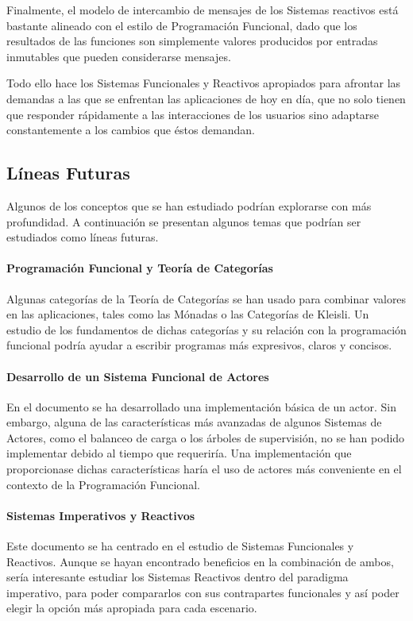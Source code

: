 \documentclass[../main.tex]{subfiles}
\begin{document}
Finalmente, el modelo de intercambio de mensajes de los Sistemas reactivos está bastante
alineado con el estilo de Programación Funcional, dado que los resultados de las funciones
son simplemente valores producidos por entradas inmutables que pueden considerarse mensajes.

Todo ello hace los Sistemas Funcionales y Reactivos apropiados para afrontar las demandas a las que
se enfrentan las aplicaciones de hoy en día, que no solo tienen que responder rápidamente
a las interacciones de los usuarios sino adaptarse constantemente a los cambios que éstos demandan.

\subsection{Líneas Futuras}
Algunos de los conceptos que se han estudiado podrían explorarse con más profundidad. A continuación
se presentan algunos temas que podrían ser estudiados como líneas futuras.


\paragraph{Programación Funcional y Teoría de Categorías}

Algunas categorías de la Teoría de Categorías se han usado para combinar valores
en las aplicaciones, tales como las Mónadas o las Categorías de Kleisli. Un estudio
de los fundamentos de dichas categorías y su relación con la programación funcional
podría ayudar a escribir programas más expresivos, claros y concisos.

\paragraph{Desarrollo de un Sistema Funcional de Actores}

En el documento se ha desarrollado una implementación básica de un actor. Sin embargo,
alguna de las características más avanzadas de algunos Sistemas de Actores, como el balanceo
de carga o los árboles de supervisión, no se han podido implementar debido al tiempo que
requeriría. Una implementación que proporcionase dichas características haría el uso de actores
más conveniente en el contexto de la Programación Funcional.

\paragraph{Sistemas Imperativos y Reactivos}
Este documento se ha centrado en el estudio de Sistemas Funcionales y Reactivos.
Aunque se hayan encontrado beneficios en la combinación de ambos, sería interesante
estudiar los Sistemas Reactivos dentro del paradigma imperativo, para poder compararlos con
sus contrapartes funcionales y así poder elegir la opción más apropiada para cada escenario.
\end{document}
